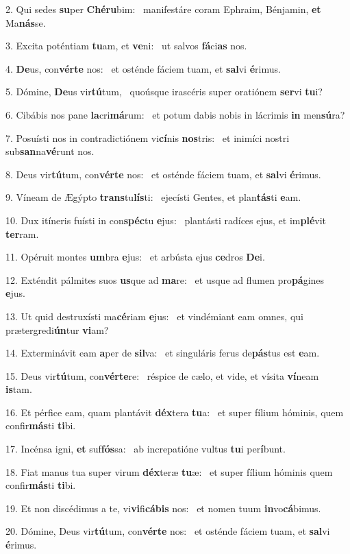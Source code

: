 2. Qui sedes \textbf{su}per \textbf{Ché}\textbf{ru}bim: \ast\  manifestáre coram Ephraim, Bénjamin, \textbf{et} Ma\textbf{nás}se.\

3. Excita poténtiam \textbf{tu}am, et \textbf{ve}ni: \ast\  ut salvos \textbf{fá}ci\textbf{as} nos.\

4. \textbf{De}us, con\textbf{vér}\textbf{te} nos: \ast\  et osténde fáciem tuam, et \textbf{sal}vi \textbf{é}rimus.\

5. Dómine, \textbf{De}us vir\textbf{tú}tum, \ast\  quoúsque irascéris super oratiónem \textbf{ser}vi \textbf{tu}i?\

6. Cibábis nos pane \textbf{la}cri\textbf{má}rum: \ast\  et potum dabis nobis in lácrimis \textbf{in} men\textbf{sú}ra?\

7. Posuísti nos in contradictiónem vi\textbf{cí}nis \textbf{nos}tris: \ast\  et inimíci nostri sub\textbf{san}na\textbf{vé}runt nos.\

8. Deus vir\textbf{tú}tum, con\textbf{vér}\textbf{te} nos: \ast\  et osténde fáciem tuam, et \textbf{sal}vi \textbf{é}rimus.\

9. Víneam de Ægýpto \textbf{trans}tu\textbf{lís}ti: \ast\  ejecísti Gentes, et plan\textbf{tás}ti \textbf{e}am.\

10. Dux itíneris fuísti in con\textbf{spéc}tu \textbf{e}jus: \ast\  plantásti radíces ejus, et im\textbf{plé}vit \textbf{ter}ram.\

11. Opéruit montes \textbf{um}bra \textbf{e}jus: \ast\  et arbústa ejus \textbf{ce}dros \textbf{De}i.\

12. Exténdit pálmites suos \textbf{us}que ad \textbf{ma}re: \ast\  et usque ad flumen pro\textbf{pá}gines \textbf{e}jus.\

13. Ut quid destruxísti ma\textbf{cé}riam \textbf{e}jus: \ast\  et vindémiant eam omnes, qui prætergredi\textbf{ún}tur \textbf{vi}am?\

14. Exterminávit eam \textbf{a}per de \textbf{sil}va: \ast\  et singuláris ferus de\textbf{pás}tus est \textbf{e}am.\

15. Deus vir\textbf{tú}tum, con\textbf{vér}\textbf{te}re: \ast\  réspice de cælo, et vide, et vísita \textbf{ví}neam \textbf{is}tam.\

16. Et pérfice eam, quam plantávit \textbf{déx}tera \textbf{tu}a: \ast\  et super fílium hóminis, quem confir\textbf{más}ti \textbf{ti}bi.\

17. Incénsa igni, \textbf{et} suf\textbf{fós}sa: \ast\  ab increpatióne vultus \textbf{tu}i per\textbf{í}bunt.\

18. Fiat manus tua super virum \textbf{déx}teræ \textbf{tu}æ: \ast\  et super fílium hóminis quem confir\textbf{más}ti \textbf{ti}bi.\

19. Et non discédimus a te, vi\textbf{vi}fi\textbf{cá}\textbf{bis} nos: \ast\  et nomen tuum \textbf{in}vo\textbf{cá}bimus.\

20. Dómine, Deus vir\textbf{tú}tum, con\textbf{vér}\textbf{te} nos: \ast\  et osténde fáciem tuam, et \textbf{sal}vi \textbf{é}rimus.\

